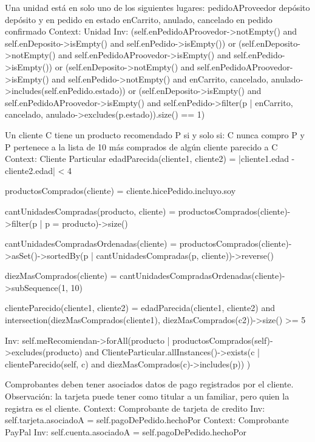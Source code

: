 \begin{listocl}
%
%
  \begin{itemocl}{
      Una unidad está en solo uno de los siguientes lugares:
          pedidoAProveedor
          depósito
          depósito y en pedido en estado enCarrito, anulado, cancelado
          en pedido confirmado
    }
Context: Unidad
Inv:
(self.enPedidoAProovedor->notEmpty() and self.enDeposito->isEmpty() and self.enPedido->isEmpty())
or
(self.enDeposito->notEmpty() and self.enPedidoAProovedor->isEmpty() and self.enPedido->isEmpty())
or
(self.enDeposito->notEmpty() and self.enPedidoAProovedor->isEmpty() and self.enPedido->notEmpty() and {enCarrito, cancelado, anulado}->includes(self.enPedido.estado))
or
(self.enDeposito->isEmpty() and self.enPedidoAProovedor->isEmpty() and self.enPedido->filter(p | {enCarrito, cancelado, anulado}->excludes(p.estado)).size() == 1)
  \end{itemocl}

%
%
  \begin{itemocl}{
      Un cliente C tiene un producto recomendado P si y solo si:
          C nunca compro P y
          P pertenece a la lista de 10 más comprados de algún cliente parecido a C
    }
Context: Cliente Particular
  edadParecida(cliente1, cliente2) = |cliente1.edad - cliente2.edad| < 4
  
  productosComprados(cliente) = cliente.hicePedido.incluyo.soy
  
  cantUnidadesCompradas(producto, cliente) = productosComprados(cliente)->filter(p | p = producto)->size()

  cantUnidadesCompradasOrdenadas(cliente) = productosComprados(cliente)->asSet()->sortedBy(p | cantUnidadesCompradas(p, cliente))->reverse()

  diezMasComprados(cliente) = cantUnidadesCompradasOrdenadas(cliente)->subSequence(1, 10)

  clienteParecido(cliente1, cliente2) = edadParecida(cliente1, cliente2) and intersection(diezMasComprados(cliente1), diezMasComprados(c2))->size() >= 5

  Inv: self.meRecomiendan->forAll(producto | productosComprados(self)->excludes(producto) 
      and ClienteParticular.allInstances()->exists(c | clienteParecido(self, c) and diezMasComprados(c)->includes(p))
  )
  \end{itemocl}

%
%
  \begin{itemocl}{Comprobantes deben tener asociados datos de pago registrados por el cliente.
Observación: la tarjeta puede tener como titular a un familiar, pero quien la registra es el cliente.}
    Context: Comprobante de tarjeta de credito
    Inv: self.tarjeta.asociadoA = self.pagoDePedido.hechoPor
    Context: Comprobante PayPal
    Inv: self.cuenta.asociadoA = self.pagoDePedido.hechoPor
  \end{itemocl}
\end{listocl}
